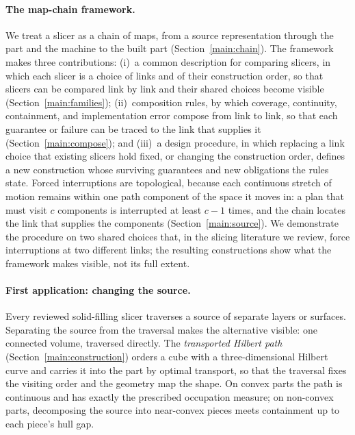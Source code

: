 \paragraph{The map-chain framework.}
We treat a slicer as a chain of maps, from a source representation through the part and the machine to the built part (Section~\ref{main:chain}). The framework makes three contributions: (i)~a common description for comparing slicers, in which each slicer is a choice of links and of their construction order, so that slicers can be compared link by link and their shared choices become visible (Section~\ref{main:families}); (ii)~composition rules, by which coverage, continuity, containment, and implementation error compose from link to link, so that each guarantee or failure can be traced to the link that supplies it (Section~\ref{main:compose}); and (iii)~a design procedure, in which replacing a link choice that existing slicers hold fixed, or changing the construction order, defines a new construction whose surviving guarantees and new obligations the rules state. Forced interruptions are topological, because each continuous stretch of motion remains within one path component of the space it moves in: a plan that must visit $c$ components is interrupted at least $c-1$ times, and the chain locates the link that supplies the components (Section~\ref{main:source}). We demonstrate the procedure on two shared choices that, in the slicing literature we review, force interruptions at two different links; the resulting constructions show what the framework makes visible, not its full extent.

\paragraph{First application: changing the source.}
Every reviewed solid-filling slicer traverses a source of separate layers or surfaces. Separating the source from the traversal makes the alternative visible: one connected volume, traversed directly. The \emph{transported Hilbert path} (Section~\ref{main:construction}) orders a cube with a three-dimensional Hilbert curve and carries it into the part by optimal transport, so that the traversal fixes the visiting order and the geometry map the shape. On convex parts the path is continuous and has exactly the prescribed occupation measure; on non-convex parts, decomposing the source into near-convex pieces meets containment up to each piece's hull gap.

